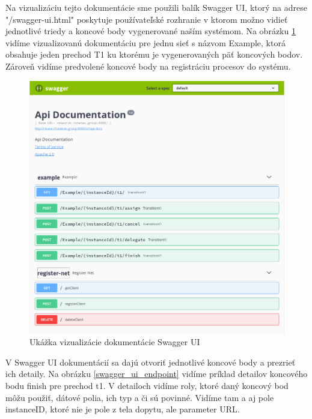 Na vizualizáciu tejto dokumentácie sme použili balík Swagger UI, ktorý na adrese "/swagger-ui.html" poskytuje používateľské rozhranie v ktorom možno vidieť jednotlivé triedy a koncové body vygenerované naším systémom. Na obrázku \ref{swagger_ui} vidíme vizualizovanú dokumentáciu pre jednu sieť s názvom Example, ktorá obsahuje jeden prechod T1 ku ktorému je vygenerovaných päť koncových bodov. Zároveň vidíme predvolené koncové body na registráciu procesov do systému.

\begin{figure}[!htbp]
	\centering
	\includegraphics[width=16cm]{img/swagger_ui.png}
	\caption{Ukážka vizualizácie dokumentácie Swagger UI}
	\label{swagger_ui}
\end{figure}

V Swagger UI dokumentácií sa dajú otvoriť jednotlivé koncové body a prezrieť ich detaily. Na obrázku \ref{swagger_ui_endpoint} vidíme príklad detailov koncového bodu finish pre prechod t1. V detailoch vidíme roly, ktoré daný koncový bod môžu použiť, dátové polia, ich typ a či sú povinné. Vidíme tam a aj pole instanceID, ktoré nie je pole z tela dopytu, ale parameter URL.

